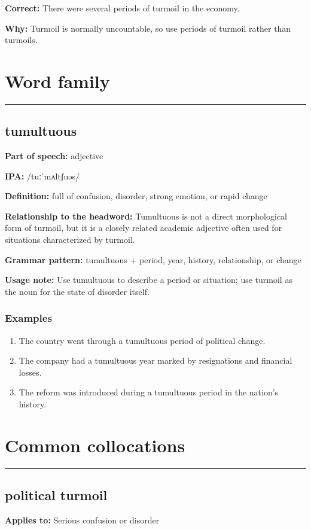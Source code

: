 \documentclass[11pt]{article}
\newcommand{\sectionrule}{\par\vspace{-0.5em}\noindent\textcolor{Accent}{\rule{\linewidth}{0.6pt}}\par}
\begin{document}
\textbf{Correct:} There were several periods of turmoil in the economy.

\textbf{Why:} Turmoil is normally uncountable, so use periods of turmoil rather than turmoils.

\section{Word family}
\sectionrule
\subsection{tumultuous}
\textbf{Part of speech:} adjective

\textbf{IPA:} /tuːˈmʌltʃuəs/

\textbf{Definition:} full of confusion, disorder, strong emotion, or rapid change

\textbf{Relationship to the headword:} Tumultuous is not a direct morphological form of turmoil, but it is a closely related academic adjective often used for situations characterized by turmoil.

\textbf{Grammar pattern:} tumultuous + period, year, history, relationship, or change

\textbf{Usage note:} Use tumultuous to describe a period or situation; use turmoil as the noun for the state of disorder itself.

\subsubsection{Examples}
\begin{enumerate}
  \item The country went through a tumultuous period of political change.
  \item The company had a tumultuous year marked by resignations and financial losses.
  \item The reform was introduced during a tumultuous period in the nation's history.
\end{enumerate}

\section{Common collocations}
\sectionrule
\subsection{political turmoil}
\textbf{Applies to:} Serious confusion or disorder
\end{document}
